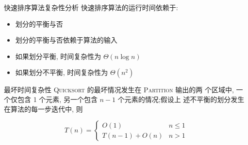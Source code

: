 \documentclass[fontset=fandol,UTF8,fleqn]{beamer}
\begin{document}
\begin{frame}{快速排序算法复杂性分析}
快速排序算法的运行时间依赖于:
\begin{itemize}[<+-|alert@+>]
\item 划分的平衡与否 
\item 划分的平衡与否依赖于算法的输入 
\item 如果划分平衡, 时间复杂性为 $\Theta(n\log n)$ 
\item 如果划分不平衡, 时间复杂性为 $\Theta(n^2)$  
\end{itemize}
\end{frame}

\begin{frame}{最坏时间复杂性}
 \textsc{Quicksort} 的最坏情况发生在 \textsc{Partition} 输出的两
  个区域中, 一个仅包含 1 个元素, 另一个包含 $n-1$ 个元素的情况;假设上
  述不平衡的划分发生在算法的每一步迭代中, 则
  \begin{exampleblock}{}
      \begin{displaymath}
    T(n)=\left\{\begin{array}{ll}
O(1) & n\leq 1   \\
T(n-1)+O(n) & n > 1   
\end{array}\right. 
\end{displaymath}
\end{exampleblock}
\end{frame}



\end{document}
